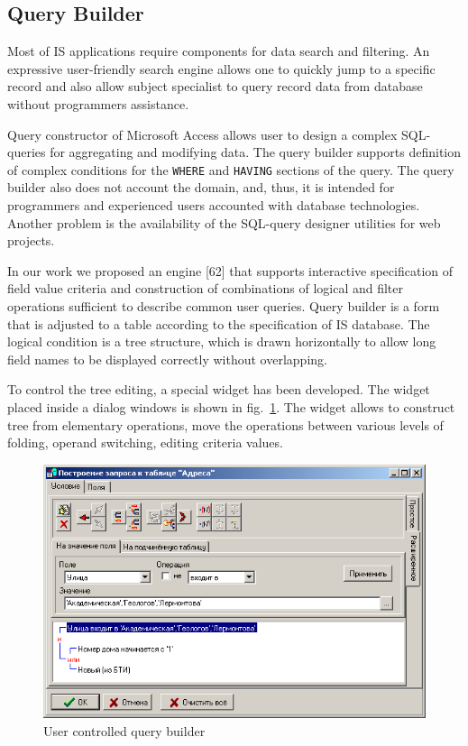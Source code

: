 \documentclass[conference]{IEEEtran}
\begin{document}
\subsection{Query Builder}
\label{sec:query-builder}

Most of IS applications require components for data search and filtering.  An expressive user-friendly search engine allows one to quickly jump to a specific record and also allow subject specialist to query record data from database without programmers assistance.

Query constructor of Microsoft Access allows user to design a complex SQL-queries for aggregating and modifying data.  The query builder supports definition of complex conditions for the \texttt{WHERE} and \texttt{HAVING} sections of the query.  The query builder also does not account the domain, and, thus, it is intended for programmers and experienced users accounted with database technologies.  Another problem is the availability of the SQL-query designer utilities for web projects.

In our work we proposed an engine [62] that supports interactive specification of field value criteria and construction of combinations of logical and filter operations sufficient to describe common user queries.  Query builder is a form that is adjusted to a table according to the specification of IS database.  The logical condition is a tree structure, which is drawn horizontally to allow long field names to be displayed correctly without overlapping.

To control the tree editing, a special widget has been developed.  The widget placed inside a dialog windows is shown in fig.~\ref{fig:qbuilder}.  The widget allows to construct tree from elementary operations, move the operations between various levels of folding, operand switching, editing criteria values.

\begin{figure}[tb]
  \centering
  \includegraphics[width=\linewidth]{qbuilder.png}
  \caption{User controlled query builder}
  \label{fig:qbuilder}
\end{figure}
\end{document}
